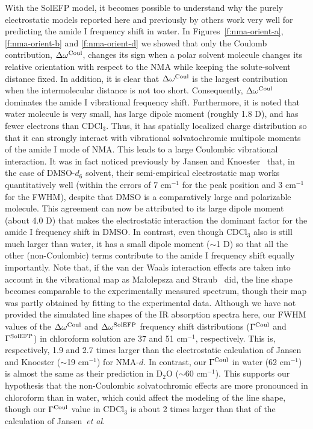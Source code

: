 \documentclass[a4paper,titlepage,twoside,fleqn,12pt]{book}
\begin{document}
\begin{refsection}
With the SolEFP model, it becomes possible to understand
why the purely electrostatic models reported here and
previously by others work very well for predicting the amide
I frequency shift in water. In Figures~\ref{f:nma-orient-a}, 
\ref{f:nma-orient-b} and \ref{f:nma-orient-d} we showed that only the Coulomb
contribution, $\Delta\omega^{\rm Coul}$, changes its sign when a polar solvent
molecule changes its relative orientation with respect to the
NMA while keeping the solute\hyp{}solvent distance fixed. In
addition, it is clear
that $\Delta\omega^{\rm Coul}$ is the largest contribution when the intermolecular
distance is not too short. Consequently, $\Delta\omega^{\rm Coul}$ dominates the
amide I vibrational frequency shift. Furthermore, it is noted
that water molecule is very small, has large dipole moment
(roughly 1.8 D), and has fewer electrons than CDCl$_3$. Thus,
it has spatially localized charge distribution so that it can
strongly interact with vibrational solvatochromic multipole
moments of the amide I mode of NMA. This leads to
a large Coulombic vibrational interaction. It was in fact
noticed previously by Jansen and Knoester~\citep{Jansen.Knoester.JCP.2006} 
that, in the case
of DMSO-$d_6$ solvent, their semi\hyp{}empirical electrostatic map
works quantitatively well (within the errors of 7 cm$^{-1}$ for
the peak position and 3 cm$^{-1}$ for the FWHM), despite that
DMSO is a comparatively large and polarizable molecule.
This agreement can now be attributed to its large dipole
moment (about 4.0 D) that makes the electrostatic interaction
the dominant factor for the amide I frequency shift in DMSO.
In contrast, even though CDCl$_3$ also is still much larger
than water, it has a small dipole moment ($\sim$1 D) so that
all the other (non\hyp{}Coulombic) terms contribute to the amide
I frequency shift equally importantly. Note that, if the van
der Waals interaction effects are taken into account in the
vibrational map as Ma{\l}olepsza and Straub~\citep{Malolepsza.Straub.JPCB.2014} did, the line
shape becomes comparable to the experimentally measured
spectrum, though their map was partly obtained by fitting to
the experimental data. Although we have not provided the
simulated line shapes of the IR absorption spectra here, our
FWHM values of the $\Delta\omega^{\rm Coul}$ and $\Delta\omega^{\rm SolEFP}$ frequency shift
distributions ($\Gamma^{\rm Coul}$ and $\Gamma^{\rm SolEFP}$) in chloroform solution are 37
and 51 cm$^{-1}$, respectively. This is, respectively, 1.9 and 2.7
times larger than the electrostatic calculation of Jansen and
Knoester ($\sim$19 cm$^{-1}$) for NMA-$d$.\citep{Jansen.Knoester.JCP.2006,Jansen.JPCB.2014} 
In contrast, our $\Gamma^{\rm Coul}$
in water (62 cm$^{-1}$) is almost the same as their prediction
in D$_2$O ($\sim$60 cm$^{-1}$).\citep{Jansen.Knoester.JCP.2006} 
This supports our hypothesis that the
non\hyp{}Coulombic solvatochromic effects are more pronounced
in chloroform than in water, which could affect the modeling
of the line shape, though our $\Gamma^{\rm Coul}$ value in CDCl$_3$ is about 2
times larger than that of the calculation of Jansen~\emph{et al.}


\end{refsection}
\end{document}
